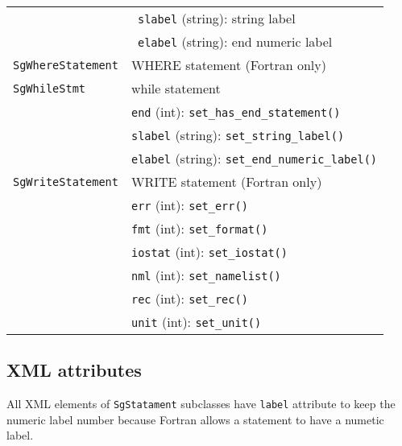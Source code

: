\begin{longtable}[l]{l|p{10cm}}
 & ~\texttt{slabel} (string): string label\\
 & ~\texttt{elabel} (string): end numeric label\\
 \texttt{SgWhereStatement}& WHERE statement (Fortran only)\\
 \texttt{SgWhileStmt}& while statement\\
 & \texttt{end} (int): \texttt{set\_has\_end\_statement()}\\
 & \texttt{slabel} (string): \texttt{set\_string\_label()}\\
 & \texttt{elabel} (string): \texttt{set\_end\_numeric\_label()}\\
 \texttt{SgWriteStatement}& WRITE statement (Fortran only)\\
 & \texttt{err} (int): \texttt{set\_err()}\\
 & \texttt{fmt} (int): \texttt{set\_format()}\\
 & \texttt{iostat} (int): \texttt{set\_iostat()}\\
 & \texttt{nml} (int): \texttt{set\_namelist()}\\
 & \texttt{rec} (int): \texttt{set\_rec()}\\
 & \texttt{unit} (int): \texttt{set\_unit()}\\
 \end{longtable}

\subsection{XML attributes}\label{sec:stmtatt}
All XML elements of \texttt{SgStatament} subclasses have \texttt{label}
attribute to keep the numeric label number because Fortran allows a
statement to have a numetic label.


